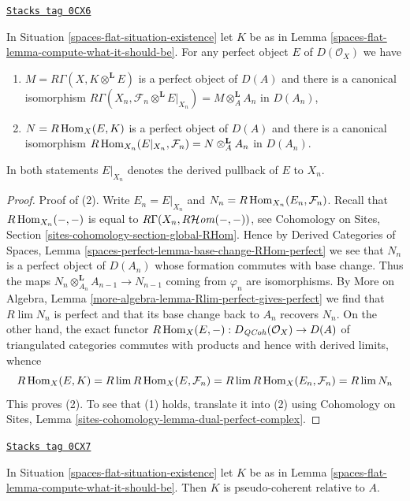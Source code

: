 \begin{lemma}
\label{spaces-flat-lemma-compute-against-perfect}
\href{https://stacks.math.columbia.edu/tag/0CX6}{\texttt{Stacks tag 0CX6}}

In Situation \ref{spaces-flat-situation-existence} let $K$ be as in
Lemma \ref{spaces-flat-lemma-compute-what-it-should-be}. For any perfect
object $E$ of $D(\mathcal{O}_X)$ we have
\begin{enumerate}
\item $M = R\Gamma(X, K \otimes^\mathbf{L} E)$ is a perfect object of $D(A)$
and there is a canonical isomorphism
$R\Gamma(X_n, \mathcal{F}_n \otimes^\mathbf{L} E|_{X_n}) =
M \otimes_A^\mathbf{L} A_n$
in $D(A_n)$,
\item $N = R\operatorname{Hom}_X(E, K)$ is a perfect object of $D(A)$
and there is a canonical isomorphism
$R\operatorname{Hom}_{X_n}(E|_{X_n}, \mathcal{F}_n) = N \otimes_A^\mathbf{L} A_n$
in $D(A_n)$.
\end{enumerate}
In both statements $E|_{X_n}$ denotes the derived pullback
of $E$ to $X_n$.
\end{lemma}

\begin{proof}
Proof of (2). Write $E_n = E|_{X_n}$ and
$N_n = R\operatorname{Hom}_{X_n}(E_n, \mathcal{F}_n)$.
Recall that $R\operatorname{Hom}_{X_n}(-, -)$ is equal to
$R\Gamma(X_n, R\mathcal{H}\mathit{om}(-, -))$, see
Cohomology on Sites, Section \ref{sites-cohomology-section-global-RHom}.
Hence by Derived Categories of Spaces, Lemma
\ref{spaces-perfect-lemma-base-change-RHom-perfect}
we see that $N_n$ is a perfect object of $D(A_n)$
whose formation commutes with base change. Thus the maps
$N_n \otimes_{A_n}^\mathbf{L} A_{n - 1} \to N_{n - 1}$
coming from $\varphi_n$ are isomorphisms.
By More on Algebra, Lemma \ref{more-algebra-lemma-Rlim-perfect-gives-perfect}
we find that $R\lim N_n$ is perfect and
that its base change back to $A_n$ recovers $N_n$.
On the other hand, the exact functor
$R\operatorname{Hom}_X(E, -) : D_{\mathit{QCoh}}(\mathcal{O}_X) \to D(A)$
of triangulated categories commutes with products
and hence with derived limits, whence
$$
R\operatorname{Hom}_X(E, K) =
R\lim R\operatorname{Hom}_X(E, \mathcal{F}_n) =
R\lim R\operatorname{Hom}_X(E_n, \mathcal{F}_n) =
R\lim N_n
$$
This proves (2). To see that (1) holds, translate it into (2)
using Cohomology on Sites, Lemma
\ref{sites-cohomology-lemma-dual-perfect-complex}.
\end{proof}

\begin{lemma}
\label{spaces-flat-lemma-relative-pseudo-coherence}
\href{https://stacks.math.columbia.edu/tag/0CX7}{\texttt{Stacks tag 0CX7}}

In Situation \ref{spaces-flat-situation-existence} let $K$ be as in
Lemma \ref{spaces-flat-lemma-compute-what-it-should-be}. Then $K$
is pseudo-coherent relative to $A$.
\end{lemma}

